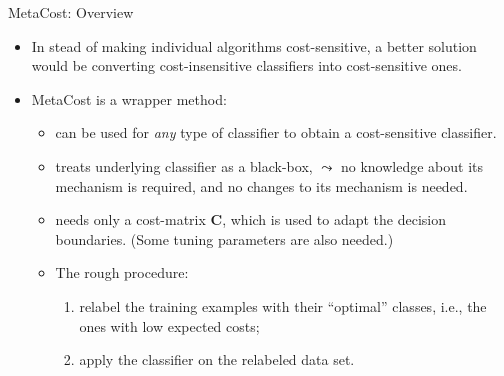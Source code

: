 \documentclass[11pt,compress,t,notes=noshow, xcolor=table]{beamer}
\begin{document}
\begin{vbframe}{MetaCost: Overview}

	\small{
	\begin{itemize}

		\item In stead of making individual algorithms cost-sensitive, a better solution would be converting cost-insensitive classifiers into cost-sensitive ones.

		\item MetaCost is a wrapper method:
        \begin{itemize}
            \small
            \item can be used for \emph{any} type of classifier to obtain a cost-sensitive classifier.
            \vspace{5pt}
            
            \item treats underlying classifier as a black-box, $\leadsto$ no knowledge about its mechanism is required, and no changes to its mechanism is needed.
            \vspace{5pt}
            
            \item needs only a cost-matrix $\mathbf{C}$, which is used to adapt the decision boundaries. {\scriptsize (Some tuning parameters are also needed.)}
            \vspace{5pt}
            
            \item The rough procedure: 
                \begin{enumerate}
                    \small
                    \item relabel the training examples with their ``optimal'' classes, i.e., the ones with low expected costs;
                    \vspace{5pt}
                    
                    \item apply the classifier on the relabeled data set.
                \end{enumerate} 
        \end{itemize}

	\end{itemize}

	}

\end{vbframe}
\end{document}
